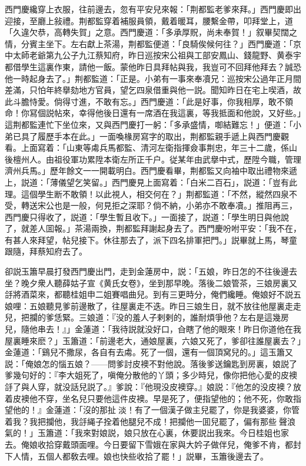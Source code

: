 西門慶纔穿上衣服，往前邊去，忽有平安兒來報：「荆都監老爹來拜。」西門慶即出迎接，至廳上敍禮。荆都監穿着補服員領，戴着暖耳，腰繫金帶，叩拜堂上，道「久違欠恭，高轉失賀」之意。西門慶道：「多承厚貺，尚未奉賀！」叙畢契闊之情，分賓主坐下。左右獻上茶湯，荆都監便道：「良騎俟候何往？」西門慶道：「京中太師老爺第九公子九江蔡知府，昨日巡按宋公祖與工部安鳳山、錢龍野、黄泰宇都借學生這裏作東，請他一飯。蒙他昨日具拜帖與我，我豈可不回拜他拜去？誠恐他一時起身去了。」荆都監道：「正是。小弟有一事來奉凟兄：巡按宋公過年正月間差滿，只怕年終擧劾地方官員，望乞四泉借重與他一説。聞知昨日在宅上喫酒，故此斗膽恃愛。倘得寸進，不敢有忘。」西門慶道：「此是好事，你我相厚，敢不領命！你冩個説帖來，幸得他後日還有一席酒在我這裏，等我抵面和他說，又好些。」這荆都監連忙下坐位來，又與西門慶打一躬：「多承盛情，啣結難忘！」便道：「小弟已具了履歷手本在此。」一面喚椽房寫字的取出，荆都監親手遞上與西門慶觀看。上面寫着：「山東等䖏兵馬都監、清河左衛指揮僉事荆忠，年三十二歲，係山後檀州人。由祖役軍功累陞本衛左所正千户。従某年由武擧中式，歷陞今職，管理濟州兵馬。」歷年餘文一一開載明白。西門慶看畢，荆都監又向袖中取出禮物來遞上，説道：「薄儀望乞笑留。」西門慶見上面寫着：「白米二百石」，説道：「豈有此理。這個學生断不敢領！以此視人，相交何在？」荆都監道：「不然，縱然四泉不受，轉送宋公也是一般，何見拒之深耶？倘不納，小弟亦不敢奉凟。」推阻再三，西門慶只得收了，説道：「學生暫且收下。」一面接了，説道：「學生明日與他說了，就差人囬報。」茶湯兩換，荆都監拜謝起身去了。西門慶吩咐平安：「我不在，有甚人來拜望，帖兒接下。休往那去了，派下四名排軍把門。」説畢就上馬，琴童跟隨，拜蔡知府去了。

卻説玉簫早晨打發西門慶出門，走到金蓮房中，説：「五娘，昨日怎的不往後邊去坐？晚夕衆人聽薛姑子宣《黄氏女卷》，坐到那早晚。落後二娘管茶，三娘房裏又㧱將酒菜來，都聽桂姐申二姐賽唱曲兒。到有三更時分，俺們纔睡。俺娘好不説五娘哩：五娘聽見爹前邊散了，往屋裏走不迭。昨日三娘生日，就不放往他屋裏走走兒，把攔的爹恁緊。三娘道：『没的羞人子剌剌的，誰耐煩爭他？左右是這幾房兒，隨他串去！』」金蓮道：「我待説就没好口，㒲瞎了他的眼來！昨日你道他在我屋裏睡來麽？」玉簫道：「前邊老大，通娘屋裏，六娘又死了，爹卻往誰屋裏去？」金蓮道：「鷄兒不撒尿，各自有去䖏。死了一個，還有一個頂窝兒的。」這玉簫又説：「俺娘怎的惱五娘？——問爹討皮襖不對他說。落後爹送鑰匙到房裏，娘説了爹幾句好的：『李大姐死了，嗔俺分散他的丫頭；多少時兒，像你把他心愛的皮襖㧱了與人穿，就没話兒説了。』爹說：『他現没皮襖穿。』娘説：『他怎的没皮襖？放着皮襖他不穿，坐名兒只要他這件皮襖。早是死了，便指望他的；他不死，你敢指望他的！』金蓮道：「沒的那扯𣭈淡！有了一個漢子做主兒罷了，你是我婆婆，你管着我？我把攔他，我㧱䋲子拴着他腿兒不成！把攔他一囬兒罷了，偏有那些𣭈聲浪氣的！」玉簫道：「我來對娘説，娘只放在心裏，休要説出我來。今日桂姐也家去。俺娘收拾穿戴頭面哩。今日要留下雪娥在家與大妗子做伴兒，俺爹不肯，都封下人情，五個人都敎去哩。娘也快些收拾了罷！」説畢，玉簫後邊去了。


